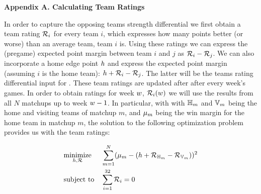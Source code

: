 \documentclass{sig-alternate}
\begin{document}
 
\small




\vspace{0.5in}

{\bf Appendix A. Calculating Team Ratings}

\vspace{0.1in}

In order to capture the opposing teams strength differential we first obtain a team rating $\mathcal{R}_i$ for every team $i$, which expresses how many points better (or worse) than an average team, team $i$ is. 
Using these ratings we can express the (pregame) expected point margin between team $i$ and $j$ as $\mathcal{R}_i - \mathcal{R}_j$. 
We can also incorporate a home edge point $h$ and express the expected point margin (assuming $i$ is the home team): $h + \mathcal{R}_i - \mathcal{R}_j$. 
The latter will be the teams rating differential input for {\method}. 
These team ratings are updated after after every week's games. 
In order to obtain ratings for week $w$, $\mathcal{R}_i(w)$ we will use the results from all $N$ matchups up to week $w-1$. 
In particular, with with $\mathbb{H}_m$ and $\mathbb{V}_m$ being the home and visiting teams of matchup $m$, and $\mu_m$ being the win margin for the home team in matchup $m$, the solution to the following  optimization problem provides us with the team ratings:

\begin{equation*}
\begin{aligned}
& \underset{h,\mathbf{\mathcal{R}}}{\text{minimize}}
& & \sum_{m=1}^N (\mu_m - (h + \mathcal{R}_{\mathbb{H}_m} - \mathcal{R}_{\mathbb{V}_m}))^2 \\
& \text{subject to}
& & \sum_{i=1}^{32} \mathcal{R}_i = 0
\end{aligned}
\end{equation*}
\end{document}
